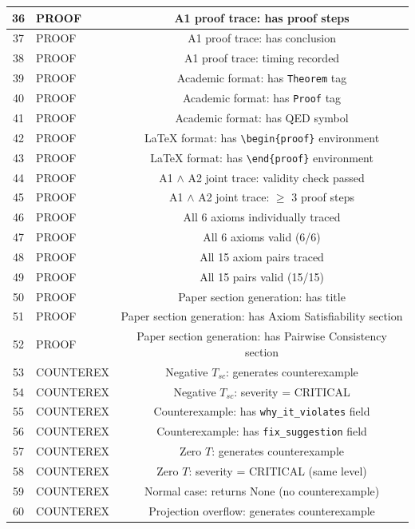 \documentclass[11pt,a4paper]{article}
\begin{document}
\begin{longtable}{|c|l|c|}
\hline
36 & PROOF & A1 proof trace: has proof steps \\
\hline
37 & PROOF & A1 proof trace: has conclusion \\
\hline
38 & PROOF & A1 proof trace: timing recorded \\
\hline
39 & PROOF & Academic format: has \texttt{Theorem} tag \\
\hline
40 & PROOF & Academic format: has \texttt{Proof} tag \\
\hline
41 & PROOF & Academic format: has QED symbol \\
\hline
42 & PROOF & LaTeX format: has \texttt{\textbackslash begin\{proof\}} environment \\
\hline
43 & PROOF & LaTeX format: has \texttt{\textbackslash end\{proof\}} environment \\
\hline
44 & PROOF & A1 $\land$ A2 joint trace: validity check passed \\
\hline
45 & PROOF & A1 $\land$ A2 joint trace: $\geq$ 3 proof steps \\
\hline
46 & PROOF & All 6 axioms individually traced \\
\hline
47 & PROOF & All 6 axioms valid (6/6) \\
\hline
48 & PROOF & All 15 axiom pairs traced \\
\hline
49 & PROOF & All 15 pairs valid (15/15) \\
\hline
50 & PROOF & Paper section generation: has title \\
\hline
51 & PROOF & Paper section generation: has Axiom Satisfiability section \\
\hline
52 & PROOF & Paper section generation: has Pairwise Consistency section \\
\hline
53 & COUNTEREX & Negative $T_{sc}$: generates counterexample \\
\hline
54 & COUNTEREX & Negative $T_{sc}$: severity = CRITICAL \\
\hline
55 & COUNTEREX & Counterexample: has \texttt{why\_it\_violates} field \\
\hline
56 & COUNTEREX & Counterexample: has \texttt{fix\_suggestion} field \\
\hline
57 & COUNTEREX & Zero $T$: generates counterexample \\
\hline
58 & COUNTEREX & Zero $T$: severity = CRITICAL (same level) \\
\hline
59 & COUNTEREX & Normal case: returns None (no counterexample) \\
\hline
60 & COUNTEREX & Projection overflow: generates counterexample \\

\end{longtable}
\end{document}

